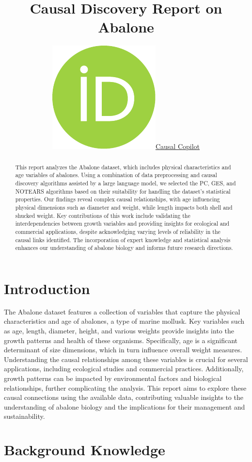 \documentclass{article}
\title{Causal Discovery Report on Abalone}
\author{ \href{https://orcid.org/0000-0000-0000-0000}{\includegraphics[scale=0.06]{postprocess/context/orcid.pdf}\hspace{1mm}Causal Copilot}}
\begin{document}
\maketitle

\begin{abstract}
This report analyzes the Abalone dataset, which includes physical characteristics and age variables of abalones. Using a combination of data preprocessing and causal discovery algorithms assisted by a large language model, we selected the PC, GES, and NOTEARS algorithms based on their suitability for handling the dataset's statistical properties. Our findings reveal complex causal relationships, with age influencing physical dimensions such as diameter and weight, while length impacts both shell and shucked weight. Key contributions of this work include validating the interdependencies between growth variables and providing insights for ecological and commercial applications, despite acknowledging varying levels of reliability in the causal links identified. The incorporation of expert knowledge and statistical analysis enhances our understanding of abalone biology and informs future research directions.
\end{abstract}


\raggedbottom
\section{Introduction}
The Abalone dataset features a collection of variables that capture the physical characteristics and age of abalones, a type of marine mollusk. Key variables such as age, length, diameter, height, and various weights provide insights into the growth patterns and health of these organisms. Specifically, age is a significant determinant of size dimensions, which in turn influence overall weight measures. Understanding the causal relationships among these variables is crucial for several applications, including ecological studies and commercial practices. Additionally, growth patterns can be impacted by environmental factors and biological relationships, further complicating the analysis. This report aims to explore these causal connections using the available data, contributing valuable insights to the understanding of abalone biology and the implications for their management and sustainability.

\section{Background Knowledge}
\end{document}

